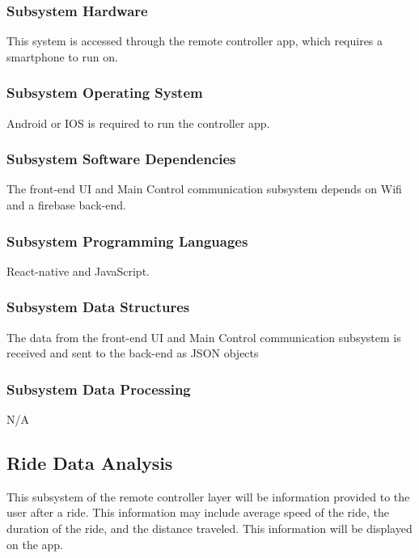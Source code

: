 \subsubsection{Subsystem Hardware}
This system is accessed through the remote controller app, which requires a smartphone to run on.

\subsubsection{Subsystem Operating System}
Android or IOS is required to run the controller app.

\subsubsection{Subsystem Software Dependencies}
The front-end UI and Main Control communication subsystem depends on Wifi and a firebase back-end.

\subsubsection{Subsystem Programming Languages}
React-native and JavaScript.

\subsubsection{Subsystem Data Structures}
The data from the front-end UI and Main Control communication subsystem is received and sent to the back-end as JSON objects

\subsubsection{Subsystem Data Processing}
N/A

\subsection{Ride Data Analysis}
This subsystem of the remote controller layer will be information provided to the user after a ride. This information may include average speed of the ride, the duration of the ride, and the distance traveled. This information will be displayed on the app.

